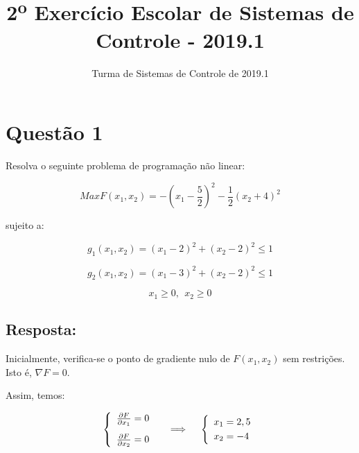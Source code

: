 \documentclass{article}
\title{2\textsuperscript{o} Exercício Escolar de Sistemas de Controle - 2019.1}
\author{Turma de Sistemas de Controle de 2019.1}
\date{}
\begin{document}
\maketitle

\section{Questão 1}

    Resolva o seguinte problema de programação não linear:

    
    $$ Max F(x_{1}, x_{2}) = - \left( x_{1} - \frac{5}{2} \right)^2 - \frac{1}{2} \left( x_{2}  + 4 \right)^2 $$
    
    sujeito a: 
    
    $$ g_{1}(x_{1}, x_{2}) =  \left( x_{1} - 2 \right)^2 +  \left( x_{2}  - 2 \right)^2 \leq 1 $$
    
    $$ g_{2}(x_{1}, x_{2}) =  \left( x_{1} - 3 \right)^2 +  \left( x_{2}  - 2 \right)^2 \leq 1 $$
    
    $$ x_{1} \geq 0 , \: \: x_{2} \geq 0  $$
    
    \subsection{Resposta:}
    
        Inicialmente, verifica-se o ponto de gradiente nulo de $F(x_{1}, x_{2})$  sem restrições. Isto é, $\nabla F = 0$. 
        
        Assim, temos: 
        
        $$ \left\{
                \begin{array}{ll}
                  \frac{\partial F}{\partial x_{1}} = 0 \vspace{0.3cm} \\
                  
                  \frac{\partial F}{\partial x_{2}} = 0
                \end{array}
              \right.
            \quad  \implies \quad 
            \left\{
                \begin{array}{ll}
                  x_{1} = 2,5 \vspace{0.1cm} \\
                  
                  x_{2} = -4
                \end{array}
              \right.
         $$
         
     \vspace{0.6cm}
     
\end{document}
